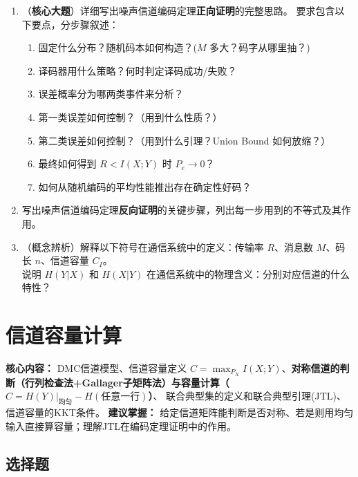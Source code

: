 \documentclass[12pt,a4paper]{ctexart}
\begin{document}
\begin{enumerate}[label=\textbf{\arabic*.}, leftmargin=*]
\item （\textbf{核心大题}）详细写出噪声信道编码定理\textbf{正向证明}的完整思路。
要求包含以下要点，分步骤叙述：
\begin{enumerate}
  \item 固定什么分布？随机码本如何构造？($M$ 多大？码字从哪里抽？)
  \item 译码器用什么策略？何时判定译码成功/失败？
  \item 误差概率分为哪两类事件来分析？
  \item 第一类误差如何控制？（用到什么性质？）
  \item 第二类误差如何控制？（用到什么引理？Union Bound 如何放缩？）
  \item 最终如何得到 $R < I(X;Y)$ 时 $P_e \to 0$？
  \item 如何从随机编码的平均性能推出存在确定性好码？
\end{enumerate}

\item 写出噪声信道编码定理\textbf{反向证明}的关键步骤，列出每一步用到的不等式及其作用。

\item （概念辨析）解释以下符号在通信系统中的定义：传输率 $R$、消息数 $M$、码长 $n$、信道容量 $C_I$。\\
说明 $H(Y|X)$ 和 $H(X|Y)$ 在通信系统中的物理含义：分别对应信道的什么特性？
\end{enumerate}

\newpage

\section{信道容量计算}

\begin{notetested}
\textbf{核心内容：} DMC信道模型、信道容量定义 $C = \max_{P_X} I(X;Y)$、\textbf{对称信道的判断（行列检查法+Gallager子矩阵法）与容量计算（$C=H(Y)|_{\text{均匀}}-H(\text{任意一行})$）}、
联合典型集的定义和联合典型引理(JTL)、信道容量的KKT条件。
\textbf{建议掌握：} 给定信道矩阵能判断是否对称、若是则用均匀输入直接算容量；理解JTL在编码定理证明中的作用。
\end{notetested}

\subsection*{选择题}
\end{document}
